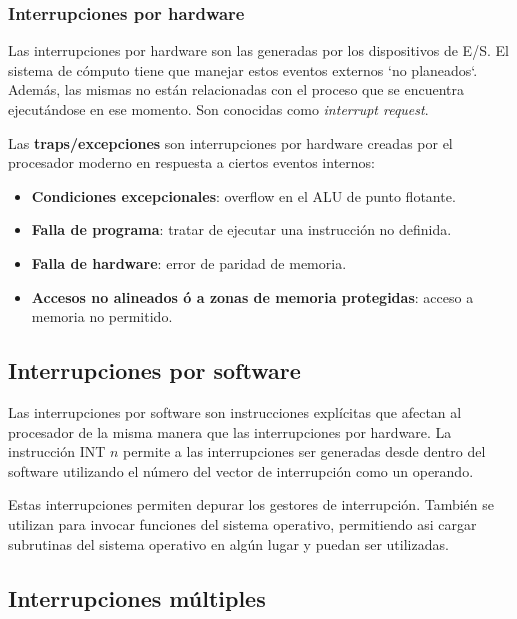 \begin{subs}
  \subsubsection{Interrupciones por hardware}
  
  Las interrupciones por hardware son las generadas por los dispositivos de E/S. El sistema de cómputo tiene que manejar estos eventos externos `no planeados`. Además, las mismas no están relacionadas con el proceso que se encuentra ejecutándose en ese momento. Son conocidas como \textit{interrupt request}.

  Las \textbf{traps/excepciones} son interrupciones por hardware creadas por el procesador moderno en respuesta a ciertos eventos internos:

  \begin{itemize}
    \item \textbf{Condiciones excepcionales}: overflow en el ALU de punto flotante.
    \item \textbf{Falla de programa}: tratar de ejecutar una instrucción no definida.
    \item \textbf{Falla de hardware}: error de paridad de memoria.
    \item \textbf{Accesos no alineados ó a zonas de memoria protegidas}: acceso a memoria no permitido.
  \end{itemize}

  \subsection{Interrupciones por software}

  Las interrupciones por software son instrucciones explícitas que afectan al procesador de la misma manera que las interrupciones por hardware. La instrucción INT $n$ permite a las interrupciones ser generadas desde dentro del software utilizando el número del vector de interrupción como un operando.

  Estas interrupciones permiten depurar los gestores de interrupción. También se utilizan para invocar funciones del sistema operativo, permitiendo asi cargar subrutinas del sistema operativo en algún lugar y puedan ser utilizadas.
\end{subs}

\subsection{Interrupciones múltiples}

